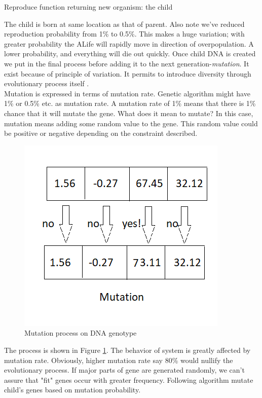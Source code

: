 \documentclass[conference]{IEEEtran}
\begin{document}
\begin{algorithm}
\caption{Reproduce function returning new organism: the child}
\begin{algorithmic} 
\ELSE
{}
\ENDIF
\end{algorithmic}
\end{algorithm}
The child is born at same location as that of parent. Also note we've reduced reproduction probability from 1\% to 0.5\%. This makes a huge variation; with greater probability the ALife will rapidly move in direction of overpopulation. A lower probability, and everything will die out quickly. Once child DNA is created we put in the final process before adding it to the next generation-\textit{mutation}. It exist because of principle of variation. It permits to introduce diversity through evolutionary process itself \cite{Stanley}.\\
Mutation is expressed in terms of mutation rate. Genetic algorithm might have 1\% or 0.5\% etc. as mutation rate. A mutation rate of 1\% means that there is 1\% chance that it will mutate the gene. What does it mean to mutate? In this case, mutation means adding some random value to the gene. This random value could be positive or negative depending on the constraint described.\\
\begin{figure}
	\includegraphics[scale=1]{mutation.png}
	\caption{Mutation process on DNA genotype}
	\label{fig:mutation}
\end{figure}
The process is shown in Figure \ref{fig:mutation}. The behavior of system is greatly affected by mutation rate. Obviously, higher mutation rate say 80\% would nullify the evolutionary process. If major parts of gene are generated randomly, we can't assure that "fit" genes occur with greater frequency. Following algorithm mutate child's genes based on mutation probability.
\end{document}
